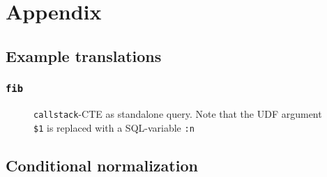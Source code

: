 \cleardoublepage
\renewcommand{\thesection}{\Alph{section}}%

\chapter[Appendix]{Appendix}
\section{Example translations}
\subsection{\texttt{fib}}
\begin{figure}\footnotesize
    \centering
    \caption{\texttt{callstack}-CTE as standalone query. Note that the UDF argument \texttt{\$1} is replaced with a SQL-variable \texttt{:n}}
    \label{fib:callstack_cte_complete}
\end{figure}
\section{Conditional normalization}
\label{sql:cond_norm}
